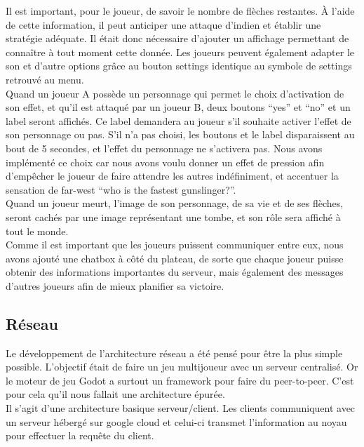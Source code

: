 \documentclass[a4paper,11pt]{article}
\begin{document}
    Il est important, pour le joueur, de savoir le nombre de flèches restantes. À l’aide de cette information, il peut anticiper une attaque d’indien et établir une stratégie adéquate.  Il était donc nécessaire d’ajouter un affichage permettant de connaître à tout moment cette donnée.
     Les joueurs peuvent également adapter le son et d'autre options grâce au bouton settings identique au symbole de settings retrouvé au menu. \\

    Quand un joueur A possède un personnage qui permet le choix d'activation de son effet, et qu’il est attaqué par un joueur B, deux boutons “yes” et “no” et un label seront affichés. Ce label demandera au joueur s'il souhaite activer l’effet de son personnage ou pas. S’il n’a pas choisi, les boutons et le label disparaissent au bout de 5 secondes, et l’effet du personnage ne s’activera pas. 
    Nous avons implémenté ce choix car nous avons voulu donner un effet de pression afin d'empêcher le joueur de faire attendre les autres indéfiniment, et accentuer la sensation de far-west “who is the fastest gunslinger?”. \\

    Quand un joueur meurt, l’image de son personnage, de sa vie et de ses flèches, seront cachés par une image représentant une tombe, et son rôle sera affiché à tout le monde. \\

    Comme il est important que les joueurs puissent communiquer entre eux, nous avons ajouté une chatbox à côté du plateau, de sorte que chaque joueur puisse obtenir des informations importantes du serveur, mais également des messages d’autres joueurs afin de mieux planifier sa victoire.


\subsection{Réseau}

    Le développement de l'architecture réseau a été pensé pour être la plus simple possible. L’objectif était de faire un jeu multijoueur avec un serveur centralisé. Or le moteur de jeu Godot a surtout un framework pour faire du peer-to-peer. C’est pour cela qu’il nous fallait une architecture épurée.  \\

    Il s’agit d’une architecture basique serveur/client. Les clients communiquent avec un serveur hébergé sur google cloud et celui-ci transmet l’information au noyau pour effectuer la requête du client. \\
\end{document}
